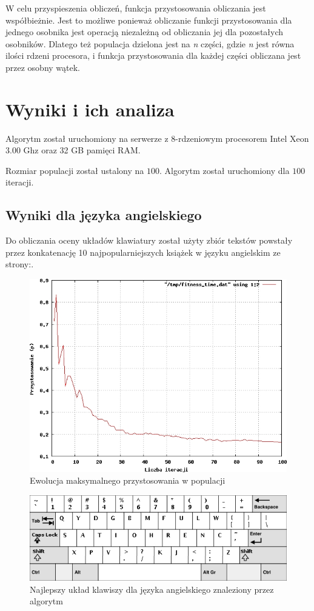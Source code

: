 \documentclass[brudnopis]{xmgr}
\begin{document}
W celu przyspieszenia obliczeń, funkcja przystosowania obliczania jest współbieżnie. Jest to możliwe ponieważ obliczanie funkcji przystosowania dla jednego osobnika jest operacją niezależną od obliczania jej dla pozostałych osobników. Dlatego też populacja dzielona jest na \emph{n} części, gdzie \emph{n} jest równa ilości rdzeni procesora, i funkcja przystosowania dla każdej części obliczana jest przez osobny wątek.


\chapter{Wyniki i ich analiza}

Algorytm został uruchomiony na serwerze z 8-rdzeniowym procesorem Intel Xeon 3.00 Ghz oraz 32 GB pamięci RAM.

Rozmiar populacji został ustalony na $100$. Algorytm został uruchomiony dla $100$ iteracji.

\section{Wyniki dla języka angielskiego}

Do obliczania oceny układów klawiatury został użyty zbiór tekstów powstały przez konkatenację 10 najpopularniejszych książek w języku angielskim ze strony:.

\begin{figure}[!tbh]
\centering
\includegraphics[width=.8\hsize]{fig/fitness_time_en}
\caption{Ewolucja maksymalnego przystosowania w populacji}
\end{figure}

\begin{figure}[!tbh]
\centering
\includegraphics[width=.8\hsize]{fig/best_en}
\caption{Najlepszy układ klawiszy dla języka angielskiego znaleziony przez algorytm}
\end{figure}
\end{document}

